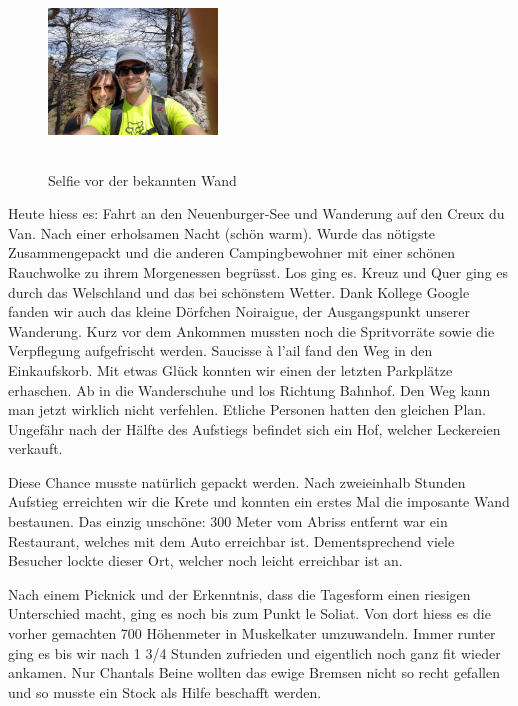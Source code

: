 \begin{figure} 
  \begin{centering}
    \includegraphics[width=0.4\textwidth, height=5cm, keepaspectratio]{../Bilder/Gruyere/17.jpg}
    \caption{Selfie vor der bekannten Wand}
  \end{centering}
\end{figure} 

Heute hiess es: Fahrt an den Neuenburger-See und Wanderung auf den Creux du Van.
Nach einer erholsamen Nacht (schön warm).
Wurde das nötigste Zusammengepackt und die anderen Campingbewohner mit einer schönen Rauchwolke zu ihrem Morgenessen begrüsst.
Los ging es.
Kreuz und Quer ging es durch das Welschland und das bei schönstem Wetter.
Dank Kollege Google fanden wir auch das kleine Dörfchen Noiraigue, der Ausgangspunkt unserer Wanderung.
Kurz vor dem Ankommen mussten noch die Spritvorräte sowie die Verpflegung aufgefrischt werden.
Saucisse à l'ail fand den Weg in den Einkaufskorb.
Mit etwas Glück konnten wir einen der letzten Parkplätze erhaschen.
Ab in die Wanderschuhe und los Richtung Bahnhof.
Den Weg kann man jetzt wirklich nicht verfehlen.
Etliche Personen hatten den gleichen Plan.
Ungefähr nach der Hälfte des Aufstiegs befindet sich ein Hof, welcher Leckereien verkauft.

Diese Chance musste natürlich gepackt werden.
Nach zweieinhalb Stunden Aufstieg erreichten wir die Krete und konnten ein erstes Mal die imposante Wand bestaunen.
Das einzig unschöne: 300 Meter vom Abriss entfernt war ein Restaurant, welches mit dem Auto erreichbar ist.
Dementsprechend viele Besucher lockte dieser Ort, welcher noch leicht erreichbar ist an.

Nach einem Picknick und der Erkenntnis, dass die Tagesform einen riesigen Unterschied macht, ging es noch bis zum Punkt le Soliat.
Von dort hiess es die vorher gemachten 700 Höhenmeter in Muskelkater umzuwandeln.
Immer runter ging es bis wir nach 1 3/4 Stunden zufrieden und eigentlich noch ganz fit wieder ankamen.
Nur Chantals Beine wollten das ewige Bremsen nicht so recht gefallen und so musste ein Stock als Hilfe beschafft werden.

